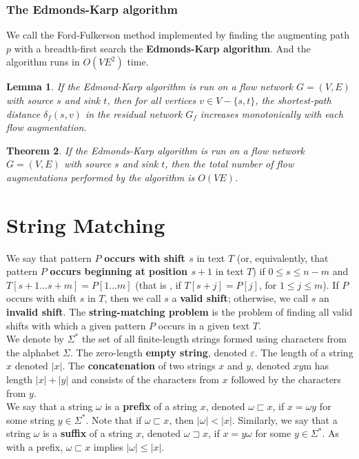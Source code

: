 \documentclass[12pt]{article}
\newtheorem{theorem}{Theorem}
\newtheorem{lemma}[theorem]{Lemma}
\begin{document}
\subsubsection*{The Edmonds-Karp algorithm}

We call the Ford-Fulkerson method implemented by finding the augmenting path $p$ with a breadth-first search the \textbf{Edmonds-Karp algorithm}. And the algorithm runs in $O(VE^2)$ time.

\begin{lemma}
  If the Edmond-Karp algorithm is run on a flow network $G = (V,E)$ with source $s$ and sink $t$, then for all vertices $v \in V - \{ s,t \}$, the shortest-path distance $\delta_f(s,v)$ in the residual network $G_f$ increases monotonically with each flow augmentation.
\end{lemma}

\begin{theorem}
  If the Edmonds-Karp algorithm is run on a flow network $G = (V,E)$ with source $s$ and sink $t$, then the total number of flow augmentations performed by the algorithm is $O(VE)$.
\end{theorem}

\section{String Matching}

We say that pattern $P$ \textbf{occurs with shift $s$} in text $T$ (or, equivalently, that pattern $P$ \textbf{occurs beginning at position $s+1$} in text $T$) if $0 \le s \le n-m$ and $T[s+1 \dots s+m] = P[1 \dots m]$ (that is , if $T[s+j] = P[j]$, for $1 \le j \le m$). If $P$ occurs with shift $s$ in $T$, then we call $s$ a \textbf{valid shift}; otherwise, we call $s$ an \textbf{invalid shift}. The \textbf{string-matching problem} is the problem of finding all valid shifts with which a given pattern $P$ occurs in a given text $T$. \\

We denote by $\Sigma^*$ the set of all finite-length strings formed using characters from the alphabet $\Sigma$. The zero-length \textbf{empty string}, denoted $\varepsilon$. The length of a string $x$ denoted $|x|$. The \textbf{concatenation} of two strings $x$ and $y$, denoted $xy$m has length $|x| + |y|$ and consists of the characters from $x$ followed by the characters from $y$. \\

We say that a string $\omega$ is a \textbf{prefix} of a string $x$, denoted $\omega \sqsubset x$, if $x = \omega y$ for some string $y \in \Sigma^*$. Note that if $\omega \sqsubset x$, then $|\omega| < |x|$. Similarly, we say that a string $\omega$ is a \textbf{suffix} of a string $x$, denoted $\omega \sqsupset x$, if $x = y \omega$ for some $y \in \Sigma^*$. As with a prefix, $\omega \sqsubset x$ implies $|\omega| \le |x|$.
\end{document}
